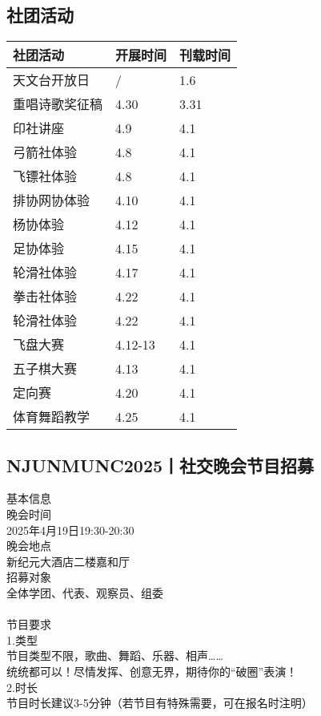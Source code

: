 \documentclass[letterpaper, 12pt]{article}
\begin{document}
\begin{multicols}{2}
\section{社团活动}
\begin{tabular}{|>{\centering\arraybackslash}m{}|m{}|m{}|}
    \hline
    社团活动 & 开展时间 & 刊载时间\\
    \hline\hline
    天文台开放日 & / & 1.6\\
    重唱诗歌奖征稿 & 4.30 & 3.31\\
    印社讲座 & 4.9 & 4.1\\
    弓箭社体验 & 4.8 & 4.1\\
    飞镖社体验 & 4.8 & 4.1\\
    排协网协体验 & 4.10 & 4.1\\
    杨协体验 & 4.12 & 4.1\\
    足协体验 & 4.15 & 4.1\\
    轮滑社体验 & 4.17 & 4.1\\
    拳击社体验 & 4.22 & 4.1\\
    轮滑社体验 & 4.22 & 4.1\\
    飞盘大赛 & 4.12-13 & 4.1\\
    五子棋大赛 & 4.13 & 4.1\\
    定向赛 & 4.20 & 4.1\\
    体育舞蹈教学 & 4.25 & 4.1\\
    \hline
\end{tabular}
\subsection{NJUNMUNC2025丨社交晚会节目招募}
基本信息
\\晚会时间
\\2025年4月19日19:30-20:30
\\晚会地点
\\新纪元大酒店二楼嘉和厅
\\招募对象
\\全体学团、代表、观察员、组委
\\
\\节目要求
\\1.类型
\\节目类型不限，歌曲、舞蹈、乐器、相声……
\\统统都可以！尽情发挥、创意无界，期待你的“破圈”表演！
\\2.时长
\\节目时长建议3-5分钟（若节目有特殊需要，可在报名时注明）



\end{multicols}
\end{document}
